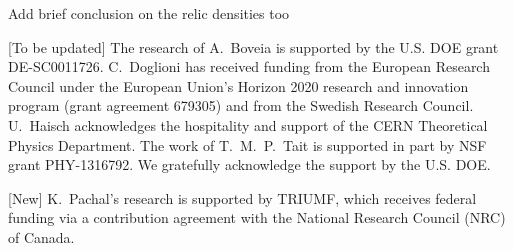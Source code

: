 \documentclass[a4paper, 11pt]{article}
\begin{document}
{\color{red}Add brief conclusion on the relic densities too}


\acknowledgments 

[To be updated] The research of A.~Boveia is supported by the U.S. DOE grant  DE-SC0011726. C.~Doglioni has received funding from the European Research Council under the European Union's Horizon 2020 research and innovation program (grant agreement 679305) and from the Swedish Research Council. U.~Haisch acknowledges the hospitality and support of the CERN Theoretical Physics Department. The work of T.~M.~P.~Tait is supported in part by NSF grant PHY-1316792. We gratefully acknowledge the support by the U.S. DOE. 

[New] K.~Pachal's research is supported by TRIUMF, which receives federal funding via a contribution agreement with the National Research Council (NRC) of Canada.








\end{document}
